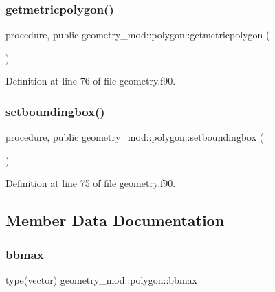 \subsubsection{\texorpdfstring{getmetricpolygon()}{getmetricpolygon()}}
{\footnotesize\ttfamily procedure, public geometry\+\_\+mod\+::polygon\+::getmetricpolygon (\begin{DoxyParamCaption}{ }\end{DoxyParamCaption})}



Definition at line 76 of file geometry.\+f90.

\mbox{\label{structgeometry__mod_1_1polygon_a7d9ad70e834269c63b3e6339c65fe2c3}} 
\subsubsection{\texorpdfstring{setboundingbox()}{setboundingbox()}}
{\footnotesize\ttfamily procedure, public geometry\+\_\+mod\+::polygon\+::setboundingbox (\begin{DoxyParamCaption}{ }\end{DoxyParamCaption})}



Definition at line 75 of file geometry.\+f90.



\subsection{Member Data Documentation}
\mbox{\label{structgeometry__mod_1_1polygon_a466582ac4df0ff7e8e0fbd74a7778a88}} 
\subsubsection{\texorpdfstring{bbmax}{bbmax}}
{\footnotesize\ttfamily type(vector) geometry\+\_\+mod\+::polygon\+::bbmax\hspace{0.3cm}{\ttfamily [private]}}



